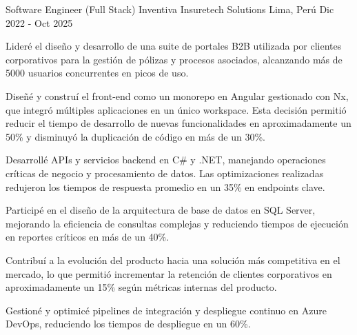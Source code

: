 

\begin{cventries}

  \cventry
    {Software Engineer (Full Stack)} %
    {Inventiva Insuretech Solutions} %
    {Lima, Perú} %
    {Dic 2022 - Oct 2025} %
    {
      \begin{cvitems} %
        \item {Lideré el diseño y desarrollo de una suite de portales B2B utilizada por clientes corporativos para la gestión de pólizas y procesos asociados, alcanzando más de 5000 usuarios concurrentes en picos de uso.}
        \item {Diseñé y construí el front-end como un monorepo en Angular gestionado con Nx, que integró múltiples aplicaciones en un único workspace. Esta decisión permitió reducir el tiempo de desarrollo de nuevas funcionalidades en aproximadamente un 50\% y disminuyó la duplicación de código en más de un 30\%.}
        \item {Desarrollé APIs y servicios backend en C\# y .NET, manejando operaciones críticas de negocio y procesamiento de datos. Las optimizaciones realizadas redujeron los tiempos de respuesta promedio en un 35\% en endpoints clave.}
        \item {Participé en el diseño de la arquitectura de base de datos en SQL Server, mejorando la eficiencia de consultas complejas y reduciendo tiempos de ejecución en reportes críticos en más de un 40\%.}
        \item {Contribuí a la evolución del producto hacia una solución más competitiva en el mercado, lo que permitió incrementar la retención de clientes corporativos en aproximadamente un 15\% según métricas internas del producto.}
        \item {Gestioné y optimicé pipelines de integración y despliegue continuo en Azure DevOps, reduciendo los tiempos de despliegue en un 60\%.}
      \end{cvitems}
    }

\end{cventries}
